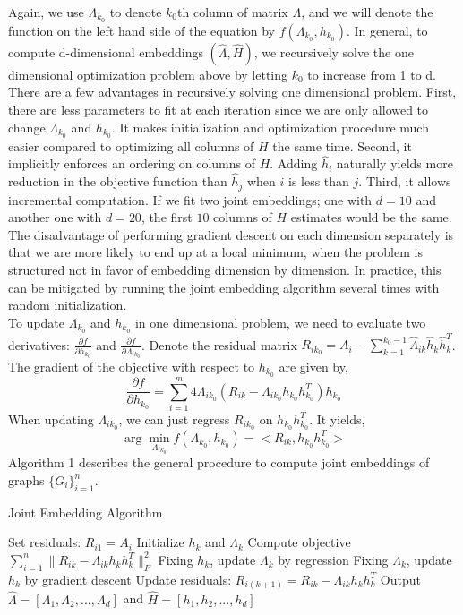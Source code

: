 \documentclass[10pt,journal,compsoc]{IEEEtran}
\begin{document}
\noindent Again, we use $\Lambda_{k_0}$ to denote $k_0$th column of matrix $\Lambda$, and we will denote the function on the left hand side of the equation by $f(\Lambda_{k_0},h_{k_0})$. In general, to compute d-dimensional embeddings $(\hat{\Lambda},\hat{H})$, we recursively solve the one dimensional optimization problem above by letting $k_0$ to increase from 1 to d. \\

\noindent There are a few advantages in recursively solving one dimensional problem. First, there are less parameters to fit at each iteration since we are only allowed to change $\Lambda_{k_0}$ and $h_{k_0}$. It makes initialization and optimization procedure much easier compared to optimizing all columns of $H$ the same time. Second, it implicitly enforces an ordering on columns of $H$. Adding $\hat{h}_i$ naturally yields more reduction in the objective function than $\hat{h}_j$ when $i$ is less than $j$. Third, it allows incremental computation. If we fit two joint embeddings; one with $d=10$ and another one with $d=20$, the first $10$ columns of $H$ estimates would be the same. The disadvantage of performing gradient descent on each dimension separately is that we are more likely to end up at a local minimum, when the problem is structured not in favor of embedding dimension by dimension. In practice, this can be mitigated by running the joint embedding algorithm several times with random initialization. \\ 

\noindent To update $\Lambda_{k_0}$ and $h_{k_0}$ in one dimensional problem, we need to evaluate two derivatives: $\frac{\partial f}{\partial h_{k_0}}$ and $\frac{\partial f}{\partial \Lambda_{i k_0}}$. Denote the residual matrix $R_{ik_0}=A_i- \sum\limits_{k=1}^{k_0-1}\hat{\Lambda}_{ik} \hat{h}_{k} \hat{h}_{k}^T$. The gradient of the objective with respect to $h_{k_0}$ are given by,
\[ \frac{\partial f}{\partial h_{k_0}} = \sum\limits_{i=1}^{m} 4 \Lambda_{ik_0} (R_{ik}-\Lambda_{ik_0} h_{k_0} h_{k_0}^T)  h_{k_0}\]
When updating $\Lambda_{i k_0}$, we can just regress $R_{ik_0}$ on $h_{k_0} h_{k_0}^T$. It yields,
\[  \arg\min_{\Lambda_{i k_0}}f(\Lambda_{k_0},h_{k_0})= <R_{ik}, h_{k_0} h_{k_0}^T> \]
Algorithm 1 describes the general procedure to compute joint embeddings of graphs $\{G_i\}_{i=1}^n$. 

\begin{algorithm}
	\caption{Joint Embedding Algorithm}
	\begin{algorithmic}[1]
		\State Set residuals: $R_{i1}=A_i$
		\State Initialize $h_k$ and $\Lambda_k$ 
		\State Compute objective $\sum\limits_{i=1}^{n} \| R_{ik}-  \Lambda_{ik} h_k h_k^T \| _F ^2$
		\State Fixing $h_k$, update $\Lambda_k$ by regression
		\State Fixing $\Lambda_k$, update $h_k$ by gradient descent
		\EndWhile
		\State Update residuals: $R_{i(k+1)}=R_{ik}- \Lambda_{ik} h_kh_k^T$
		\EndFor
		\State Output $\hat{\Lambda}=[\Lambda_1,\Lambda_2,...,\Lambda_d]$ and $\hat{H}=[h_1,h_2,...,h_d]$
		\EndProcedure
	\end{algorithmic}
\end{algorithm}
\end{document}
